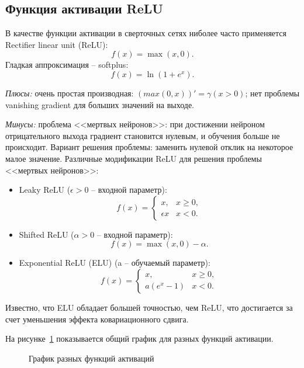 \documentclass[12pt, specialist, subf, substylefile = spbu.rtx]{disser}
\begin{document}
\subsection{Функция активации ReLU}

В качестве функции активации в сверточных сетях ниболее часто применяется Rectifier linear unit (ReLU):
$$
f(x)=\max(x, 0).
$$
Гладкая аппроксимация -- softplus:
$$
f(x)=\ln(1+e^x).
$$

\textit{Плюсы:} очень простая производная: $(max(0, x))'=\gamma(x>0)$; нет проблемы vanishing gradient для больших значений на выходе.

\textit{Минусы:} проблема <<мертвых нейронов>>: при достижении нейроном отрицательного выхода градиент становится нулевым, и обучения больше не происходит. Вариант решения проблемы: заменить нулевой отклик на некоторое малое значение. Различные модификации ReLU для решения проблемы <<мертвых нейронов>>:
\begin{itemize}
\item Leaky ReLU ($\epsilon > 0$ -- входной параметр): 
$$
f(x)=
\begin{cases}
x, & x \ge 0, \\
\epsilon x & x < 0.
\end{cases}
$$

\item Shifted ReLU ($\alpha>0$ -- входной параметр): 
$$
f(x)=\max(x, 0) - \alpha.
$$

\item Exponential ReLU (ELU) (a -- обучаемый параметр):
$$
f(x)=
\begin{cases}
x, & x \ge 0, \\
a(e^x-1) & x < 0.
\end{cases}
$$

\end{itemize}

Известно, что ELU обладает большей точностью, чем ReLU, что достигается за счет уменьшения эффекта ковариационного сдвига.

На рисунке~\ref{img:elu} показывается общий график для разных функций активации.

\begin{figure}[h]
\caption{График разных функций активаций}
\label{img:elu}
\end{figure}
\end{document}
